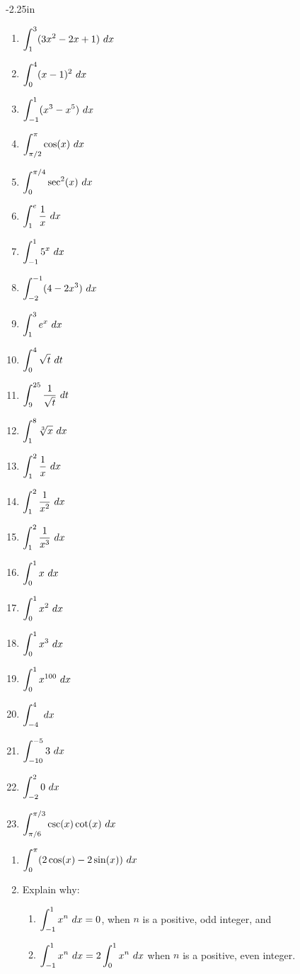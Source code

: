 \begin{adjustwidth*}{}{-2.25in}
\begin{multicols*}{2}
\bmtwo
\begin{enumerate}[1),resume]
\item $\ds\int_1^3 (3x^2-2x+1)\ dx$
\item $\ds\int_0^4 (x-1)^2\ dx$
\item $\ds\int_{-1}^1 (x^3-x^5)\ dx$
\item $\ds\int_{\pi/2}^\pi \cos (x)\ dx$
\item $\ds\int_{0}^{\pi/4} \sec^2 (x)\ dx$
\item $\ds\int_{1}^{e} \frac1x \ dx$
\item $\ds\int_{-1}^{1} 5^x \ dx$
\item $\ds\int_{-2}^{-1} (4-2x^3) \ dx$
\item $\ds\int_{1}^{3} e^x \ dx$
\item $\ds\int_{0}^{4} \sqrt{t} \ dt$
\item $\ds\int_{9}^{25} \frac{1}{\sqrt{t}} \ dt$
\item $\ds\int_{1}^{8} \sqrt[3]{x} \ dx$
\item $\ds\int_{1}^{2} \frac1{x} \ dx$
\item $\ds\int_{1}^{2} \frac1{x^2} \ dx$
\item $\ds\int_{1}^{2} \frac1{x^3} \ dx$
\item $\ds\int_{0}^{1} x \ dx$
\item $\ds\int_{0}^{1} x^2 \ dx$
\item $\ds\int_{0}^{1} x^3 \ dx$
\item $\ds\int_{0}^{1} x^{100} \ dx$
\item $\displaystyle\int_{-4}^{4} \ dx$
\item $\ds\int_{-10}^{-5} 3\ dx$
\item $\ds\int_{-2}^{2} 0\ dx$
\item $\displaystyle \int_{\pi/6}^{\pi/3} \csc (x)\cot (x)\ dx$
\end{enumerate}
\emtwo

\begin{enumerate}[1),start=62]
\item $\displaystyle\int_{0}^{\pi} (2\cos (x) - 2\sin (x)) \ dx$
\item Explain why:
\begin{enumerate}
\item		$\displaystyle \int_{-1}^1 x^n\ dx=0$, when $n$ is a positive, odd integer, and 
\item		$\displaystyle \int_{-1}^1 x^n\ dx = 2\int_{0}^1 x^n\ dx$ when $n$ is a positive, even integer.
\end{enumerate}
\end{enumerate}


\end{multicols*}
\end{adjustwidth*}
